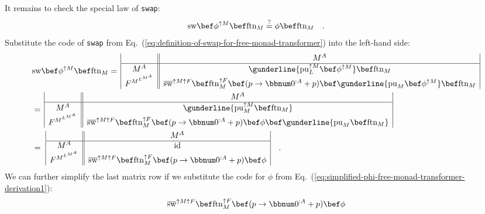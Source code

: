 It remains to check the special law of \lstinline!swap!:
\begin{equation}
\text{sw}\bef\phi^{\uparrow M}\bef\text{ftn}_{M}\overset{?}{=}\phi\bef\text{ftn}_{M}\quad.\label{eq:free-monad-transformer-swap-law-derivation2}
\end{equation}
Substitute the code of \lstinline!swap! from Eq.~(\ref{eq:definition-of-swap-for-free-monad-transformer})
into the left-hand side:
\begin{align*}
 & \text{sw}\bef\phi^{\uparrow M}\bef\text{ftn}_{M}=\,\begin{array}{|c||c|}
 & M^{A}\\
\hline M^{A} & \gunderline{\text{pu}_{L}^{\uparrow M}\bef\phi^{\uparrow M}}\bef\text{ftn}_{M}\\
F^{M^{L^{M^{A}}}} & \overline{\text{sw}}^{\uparrow M\uparrow F}\bef\text{ftn}_{M}^{\uparrow F}\bef(p\rightarrow\bbnum 0^{:A}+p)\bef\gunderline{\text{pu}_{M}\bef\phi^{\uparrow M}}\bef\text{ftn}_{M}
\end{array}\\
 & =\,\begin{array}{|c||c|}
 & M^{A}\\
\hline M^{A} & \gunderline{\text{pu}_{M}^{\uparrow M}\bef\text{ftn}_{M}}\\
F^{M^{L^{M^{A}}}} & \overline{\text{sw}}^{\uparrow M\uparrow F}\bef\text{ftn}_{M}^{\uparrow F}\bef(p\rightarrow\bbnum 0^{:A}+p)\bef\phi\bef\gunderline{\text{pu}_{M}\bef\text{ftn}_{M}}
\end{array}\\
 & =\,\,\begin{array}{|c||c|}
 & M^{A}\\
\hline M^{A} & \text{id}\\
F^{M^{L^{M^{A}}}} & \overline{\text{sw}}^{\uparrow M\uparrow F}\bef\text{ftn}_{M}^{\uparrow F}\bef(p\rightarrow\bbnum 0^{:A}+p)\bef\phi
\end{array}\quad.
\end{align*}
We can further simplify the last matrix row if we substitute the code
for $\phi$ from Eq.~(\ref{eq:simplified-phi-free-monad-transformer-derivation1}):
\[
\overline{\text{sw}}^{\uparrow M\uparrow F}\bef\text{ftn}_{M}^{\uparrow F}\bef(p\rightarrow\bbnum 0^{:A}+p)\bef\phi
\]

